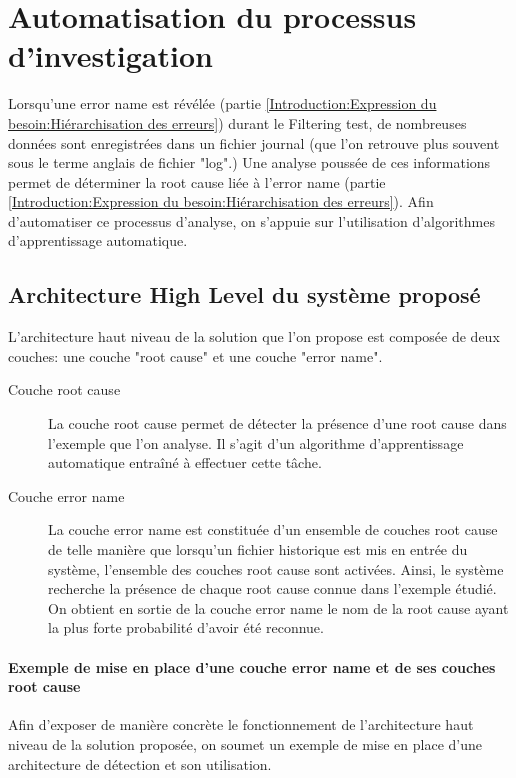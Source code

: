 \chapter{Automatisation du processus d'investigation}
\label{Automatisation du processus d'investigation}
\thispagestyle{fancy}
Lorsqu'une error name est révélée (partie \ref{Introduction:Expression du besoin:Hiérarchisation des erreurs}) durant le Filtering test, de nombreuses données sont enregistrées dans un fichier journal (que l'on retrouve plus souvent sous le terme anglais de fichier "log".) Une analyse poussée de ces informations permet de déterminer la root cause liée à l'error name (partie \ref{Introduction:Expression du besoin:Hiérarchisation des erreurs}). Afin d'automatiser ce processus d'analyse, on s'appuie sur l'utilisation d'algorithmes d'apprentissage automatique. 

\section{Architecture High Level du système proposé}
\label{Automatisation du processus d'investigation: Achitecture High Level du système proposé}
L'architecture haut niveau de la solution que l'on propose est composée de deux couches: une couche "root cause" et une couche "error name".
\begin{description}
	\item [Couche root cause] La couche root cause permet de détecter la présence d'une root cause dans l'exemple que l'on analyse. Il s'agit d'un algorithme d'apprentissage automatique entraîné à effectuer cette tâche.
	\item [Couche error name] La couche error name est constituée d'un ensemble de couches root cause de telle manière que lorsqu'un fichier historique est mis en entrée du système, l'ensemble des couches root cause sont activées. Ainsi, le système recherche la présence de chaque root cause connue dans l'exemple étudié. On obtient en sortie de la couche error name le nom de la root cause ayant la plus forte probabilité d'avoir été reconnue.
\end{description} 

\subsubsection{Exemple de mise en place  d'une couche error name et de ses couches root cause}
Afin d'exposer de manière concrète le fonctionnement de l'architecture haut niveau de la solution proposée, on soumet un exemple de mise en place d'une architecture de détection et son utilisation. \\

